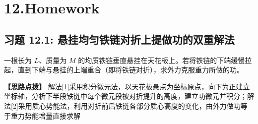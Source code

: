 \documentclass[11pt,a4paper,UTF8]{ctexart}
\begin{document}
\pagestyle{fancy}
\fancyhf{}
\fancyhead[R]{\small\color{TitlePurple}\nouppercase{\leftmark}}
\renewcommand{\headrulewidth}{0.5pt}

\tableofcontents
\newpage
{}


\section{12.Homework}


\subsection{习题 12.1: 悬挂均匀铁链对折上提做功的双重解法}

一根长为 $L$、质量为 $M$ 的均质铁链垂直悬挂在天花板上。若将铁链的下端缓慢拉起，直到下端与悬挂的上端重合（即将铁链对折），求外力克服重力所做的功。

\textbf{\color{DeepPurple}【思路点拨】} 解法[1]采用积分微元法，以天花板悬点为坐标原点，向下为正建立坐标轴，分析下半段铁链中每个微元段被对折提升的高度，建立功微元并积分；解法[2]采用质心势能法，利用对折前后铁链各部分质心高度的变化，由外力做功等于重力势能增量直接求解
\end{document}
